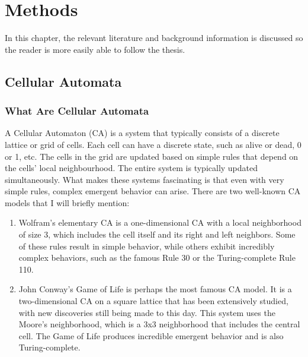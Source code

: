 
\chapter{Methods} %
\label{Chapter2} %
In this chapter, the relevant literature and background information is discussed so the reader is more easily able to follow the thesis. 
\section{Cellular Automata}
\subsection{What Are Cellular Automata}
A Cellular Automaton (CA) is a system that typically consists of a discrete lattice or grid of cells.
Each cell can have a discrete state, such as alive or dead, 0 or 1, etc. The cells in the grid are updated
based on simple rules that depend on the cells’ local neighbourhood. The entire system is typically
updated simultaneously. What makes these systems fascinating is that even with very simple rules,
complex emergent behavior can arise.
There are two well-known CA models that I will briefly mention:

\begin{enumerate}
	\item Wolfram’s elementary CA is a one-dimensional CA with a local neighborhood of size 3, which
	includes the cell itself and its right and left neighbors. Some of these rules result in simple
	behavior, while others exhibit incredibly complex behaviors, such as the famous Rule 30 or the
	Turing-complete Rule 110.
	\item John Conway’s Game of Life is perhaps the most famous CA model. It is a two-dimensional
	CA on a square lattice that has been extensively studied, with new discoveries still being made
	to this day. This system uses the Moore’s neighborhood, which is a 3x3 neighborhood that
	includes the central cell. The Game of Life produces incredible emergent behavior and is also
	Turing-complete.
\end{enumerate}

